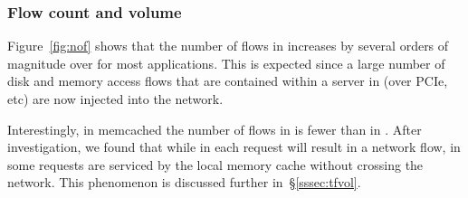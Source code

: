 \subsubsection{Flow count and volume}
\label{sssec:fctv}
Figure~\ref{fig:nof} shows that the number of flows in \dis increases by several orders of magnitude over \pdis for most applications. This is expected since a large number of disk and memory access flows that are contained within a server in \pdis (over PCIe, etc) are now injected into the network.

Interestingly, in memcached the number of flows in \ddc is fewer than in \pdis. After investigation, we found that while in \pdis each request will result in a network flow, in \dis some requests are serviced by the local memory cache without crossing the network. This phenomenon is discussed further in~\S\ref{sssec:tfvol}.

%
\begin{figure}
  \centering
  \caption{\small{}}
  \label{fig:fat}
\end{figure}
%
